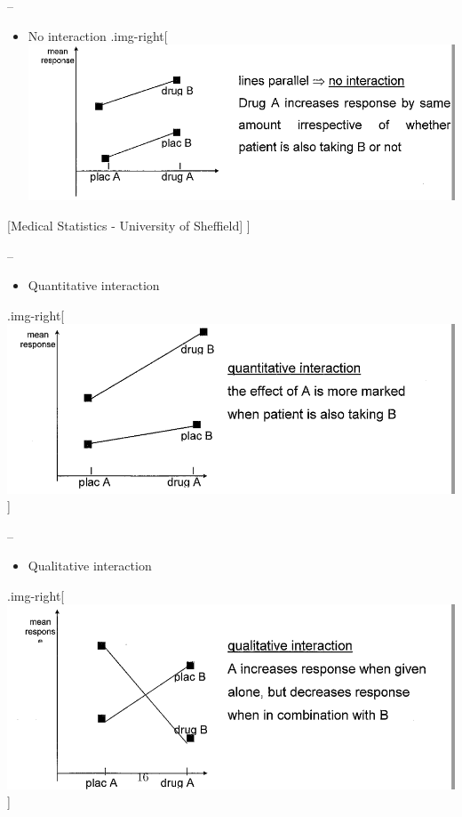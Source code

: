 \documentclass[]{article}
\providecommand{\tightlist}{%
  \setlength{\itemsep}{0pt}\setlength{\parskip}{0pt}}
\begin{document}
--

\begin{itemize}
\tightlist
\item
  No interaction .img-right{[}
  \includegraphics{../inst/images/TypesOfInteractions_NO.png}
\end{itemize}

{[}Medical Statistics - University of Sheffield{]} {]}

--

\begin{itemize}
\tightlist
\item
  Quantitative interaction
\end{itemize}

.img-right{[}
\includegraphics{../inst/images/TypesOfInteractions_Quanti.png}{]}

--

\begin{itemize}
\tightlist
\item
  Qualitative interaction
\end{itemize}

.img-right{[}
\includegraphics{../inst/images/TypesOfInteractions_Quali.png}{]}
\end{document}
